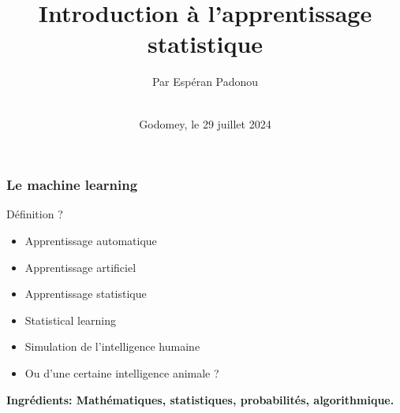\documentclass[10pt]{beamer}
\title{Introduction à l'apprentissage statistique}
\author{Par Esp\'eran Padonou}
\institute[EEIA]{
      \texttt{[image: 
      \{figures/LOGO EEIA.png]}}
\date[Godomey 2024]{ \\  Godomey, le 29 juillet 2024 }
\begin{document}
\maketitle

\begin{frame}
\frametitle {Le machine learning}

\begin{block}{Définition ?}
\small {\begin{itemize}
\item Apprentissage automatique
\item Apprentissage artificiel
\item Apprentissage statistique
\item Statistical learning   
\item Simulation de l'intelligence humaine
\item Ou d'une certaine intelligence animale ?
\end{itemize}}
\end{block}
 

\begin{minipage}{\textwidth}
\vspace{0.1\textwidth}
\centering
 \textbf{Ingrédients:  Mathématiques, statistiques, probabilités, algorithmique.}
\end{minipage}
\end{frame}
\end{document}
